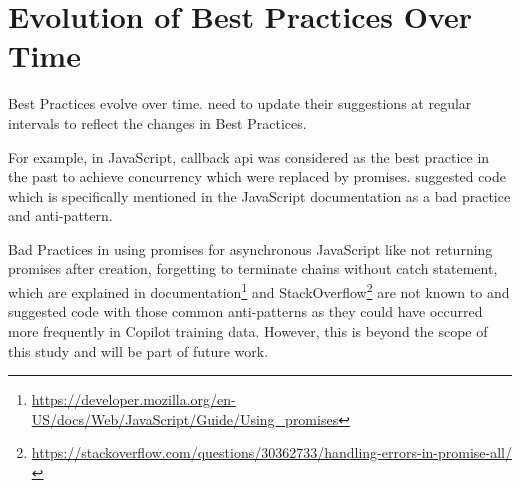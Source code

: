 \section{Evolution of Best Practices Over Time}
\label{evolution}
Best Practices evolve over time. \cct{} need to update their suggestions at regular intervals to reflect the changes in Best Practices. 

For example, in JavaScript, callback api was considered as the best practice in the past to achieve concurrency which were replaced by promises. \cop{} suggested code which is specifically mentioned in the JavaScript documentation as a bad practice and anti-pattern.

Bad Practices in using promises for asynchronous JavaScript like not returning promises after creation, forgetting to terminate chains without catch statement, which are explained in documentation\footnote{\label{docs}\url{https://developer.mozilla.org/en-US/docs/Web/JavaScript/Guide/Using_promises}} and StackOverflow\footnote{\url{https://stackoverflow.com/questions/30362733/handling-errors-in-promise-all/}} are not known to \cop{} and suggested code with those common anti-patterns as they could have occurred more frequently in Copilot training data. However, this is beyond the scope of this study and will be part of future work.